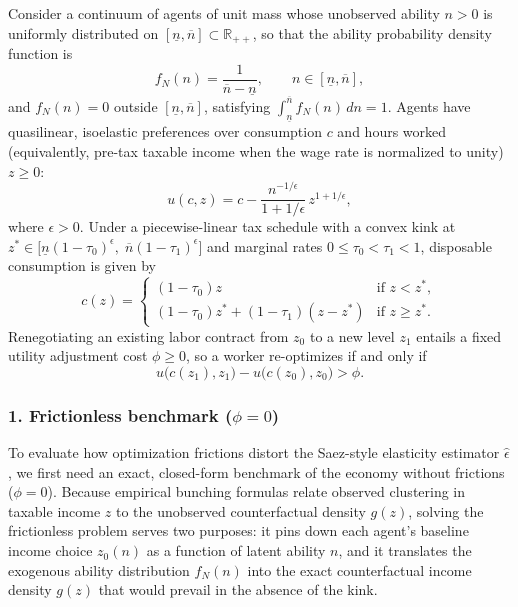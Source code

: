 Consider a continuum of agents of unit mass whose unobserved ability $n > 0$ is uniformly distributed on $[\underline{n}, \overline{n}] \subset \mathbb{R}_{++}$, so that the ability probability density function is
\begin{equation}
f_N(n) = \frac{1}{\overline{n} - \underline{n}}, \qquad n \in [\underline{n}, \overline{n}],
\label{eq:p2_ability_pdf}
\end{equation}
and $f_N(n) = 0$ outside $[\underline{n}, \overline{n}]$, satisfying $\int_{\underline{n}}^{\overline{n}} f_N(n)\,dn = 1$. Agents have quasilinear, isoelastic preferences over consumption $c$ and hours worked (equivalently, pre-tax taxable income when the wage rate is normalized to unity) $z \ge 0$:
\begin{equation}
u(c, z) = c - \frac{n^{-1/\epsilon}}{1 + 1/\epsilon}\,z^{1 + 1/\epsilon},
\label{eq:p2_utility}
\end{equation}
where $\epsilon > 0$. Under a piecewise-linear tax schedule with a convex kink at $z^* \in \big[\underline{n}(1-\tau_0)^\epsilon,\; \overline{n}(1-\tau_1)^\epsilon\big]$ and marginal rates $0 \le \tau_0 < \tau_1 < 1$, disposable consumption is given by
\begin{equation}
c(z) = \begin{cases}
(1-\tau_0)z & \text{if } z < z^*, \\[3pt]
(1-\tau_0)z^* + (1-\tau_1)(z - z^*) & \text{if } z \ge z^*.
\end{cases}
\label{eq:p2_budget}
\end{equation}
Renegotiating an existing labor contract from $z_0$ to a new level $z_1$ entails a fixed utility adjustment cost $\phi \ge 0$, so a worker re-optimizes if and only if
\begin{equation}
u\big(c(z_1), z_1\big) - u\big(c(z_0), z_0\big) > \phi.
\label{eq:p2_friction_rule}
\end{equation}

\subsubsection*{1. Frictionless benchmark ($\phi = 0$)}

To evaluate how optimization frictions distort the Saez-style elasticity estimator $\hat{\epsilon}$, we first need an exact, closed-form benchmark of the economy without frictions ($\phi = 0$). Because empirical bunching formulas relate observed clustering in taxable income $z$ to the unobserved counterfactual density $g(z)$, solving the frictionless problem serves two purposes: it pins down each agent's baseline income choice $z_0(n)$ as a function of latent ability $n$, and it translates the exogenous ability distribution $f_N(n)$ into the exact counterfactual income density $g(z)$ that would prevail in the absence of the kink.

